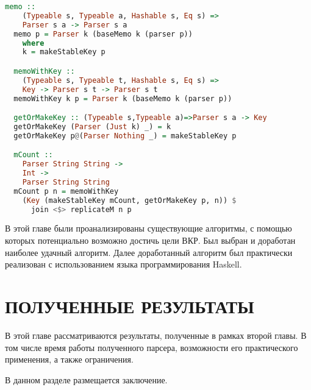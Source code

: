 \documentclass[times]{itmo-student-thesis}
\begin{document}
\begin{lstlisting}[language=Haskell,float=!h,caption={Исправленный mCount},label={lst:mcount_fixed}]
  memo :: 
    (Typeable s, Typeable a, Hashable s, Eq s) => 
    Parser s a -> Parser s a
  memo p = Parser k (baseMemo k (parser p))
    where
    k = makeStableKey p

  memoWithKey :: 
    (Typeable s, Typeable t, Hashable s, Eq s) => 
    Key -> Parser s t -> Parser s t
  memoWithKey k p = Parser k (baseMemo k (parser p))

  getOrMakeKey :: (Typeable s,Typeable a)=>Parser s a -> Key
  getOrMakeKey (Parser (Just k) _) = k
  getOrMakeKey p@(Parser Nothing _) = makeStableKey p

  mCount :: 
    Parser String String -> 
    Int -> 
    Parser String String
  mCount p n = memoWithKey 
    (Key (makeStableKey mCount, getOrMakeKey p, n)) $ 
      join <$> replicateM n p
\end{lstlisting}

\chapterconclusion

В этой главе были проанализированы существующие алгоритмы, с помощью которых потенциально возможно достичь цели ВКР. 
Был выбран и доработан наиболее удачный алгоритм. Далее доработанный алгоритм был практически реализован с использованием 
языка программирования Haskell.

\chapter{ПОЛУЧЕННЫЕ РЕЗУЛЬТАТЫ}

В этой главе рассматриваются результаты, полученные в рамках второй главы. В том числе время работы полученного парсера,
возможности его практического применения, а также ограничения. 


\startconclusionpage

В данном разделе размещается заключение.

\printmainbibliography
\end{document}
